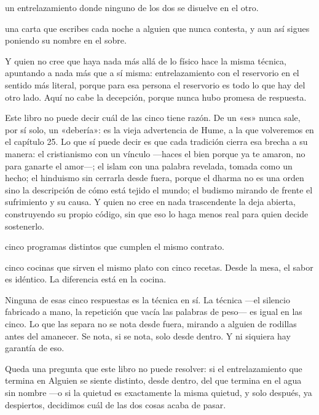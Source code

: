 \begin{fisica}
 un entrelazamiento donde ninguno de los dos se disuelve en el otro.

 una carta que escribes cada noche a alguien que nunca contesta, y aun así sigues poniendo su nombre en el sobre.
\end{fisica}
Y quien no cree que haya nada más allá de lo físico hace la misma técnica, apuntando a nada más que a sí misma: entrelazamiento con el reservorio en el sentido más literal, porque para esa persona el reservorio es todo lo que hay del otro lado. Aquí no cabe la decepción, porque nunca hubo promesa de respuesta.

\noindent Este libro no puede decir cuál de las cinco tiene razón. De un «es» nunca sale, por sí solo, un «debería»: es la vieja advertencia de Hume, a la que volveremos en el capítulo 25. Lo que sí puede decir es que cada tradición cierra esa brecha a su manera: el cristianismo con un vínculo —haces el bien porque ya te amaron, no para ganarte el amor—; el islam con una palabra revelada, tomada como un hecho; el hinduismo sin cerrarla desde fuera, porque el dharma no es una orden sino la descripción de cómo está tejido el mundo; el budismo mirando de frente el sufrimiento y su causa. Y quien no cree en nada trascendente la deja abierta, construyendo su propio código, sin que eso lo haga menos real para quien decide sostenerlo.

\begin{fisica}
 cinco programas distintos que cumplen el mismo contrato.

 cinco cocinas que sirven el mismo plato con cinco recetas. Desde la mesa, el sabor es idéntico. La diferencia está en la cocina.
\end{fisica}
Ninguna de esas cinco respuestas es la técnica en sí. La técnica —el silencio fabricado a mano, la repetición que vacía las palabras de peso— es igual en las cinco. Lo que las separa no se nota desde fuera, mirando a alguien de rodillas antes del amanecer. Se nota, si se nota, solo desde dentro. Y ni siquiera hay garantía de eso.

Queda una pregunta que este libro no puede resolver: si el entrelazamiento que termina en Alguien se siente distinto, desde dentro, del que termina en el agua sin nombre —o si la quietud es exactamente la misma quietud, y solo después, ya despiertos, decidimos cuál de las dos cosas acaba de pasar.

